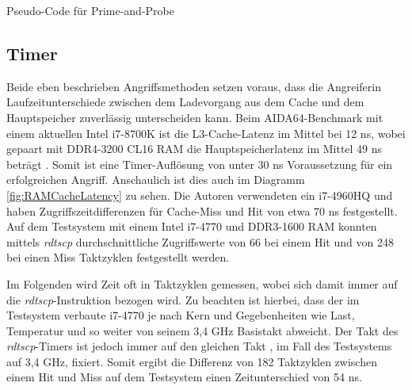 
\begin{algorithm}[h]
\DontPrintSemicolon
\caption{Pseudo-Code für Prime-and-Probe}
\label{alg:prime_and_pribe}


\end{algorithm}




\subsection{Timer}

Beide eben beschrieben Angriffsmethoden setzen voraus, dass die Angreiferin Laufzeitunterschiede zwischen dem Ladevorgang aus dem Cache und dem Hauptspeicher zuverlässig unterscheiden kann. Beim AIDA64-Benchmark mit einem aktuellen Intel i7-8700K ist die L3-Cache-Latenz im Mittel bei 12 ns, wobei gepaart mit DDR4-3200 CL16 RAM die Hauptspeicherlatenz im Mittel 49 ns beträgt \cite{i78700kLatency}. Somit ist eine Timer-Auflösung von unter 30 ns Voraussetzung für ein erfolgreichen Angriff. Anschaulich ist dies auch im Diagramm \ref{fig:RAMCacheLatency} zu sehen. Die Autoren verwendeten ein i7-4960HQ und haben Zugriffszeitdifferenzen für Cache-Miss und Hit von etwa 70 ns festgestellt. 
Auf dem Testsystem mit einem Intel i7-4770 und DDR3-1600 RAM konnten mittels \textit{rdtscp} durchschnittliche Zugriffswerte von 66 bei einem Hit und von 248 bei einen Miss Taktzyklen festgestellt werden.

Im Folgenden wird Zeit oft in Taktzyklen gemessen, wobei sich damit immer auf die \textit{rdtscp}-Instruktion bezogen wird.
Zu beachten ist hierbei, dass der im Testsystem verbaute i7-4770 je nach Kern und Gegebenheiten wie Last, Temperatur und so weiter von seinem 3,4 GHz Basistakt abweicht.
Der Takt des \textit{rdtscp}-Timers ist jedoch immer auf den gleichen Takt \cite{IntelManualRDTSCP}, im Fall des Testsystems auf 3,4 GHz, fixiert.
Somit ergibt die Differenz von 182 Taktzyklen zwischen einem Hit und Miss auf dem Testsystem einen Zeitunterschied von 54 ns.

